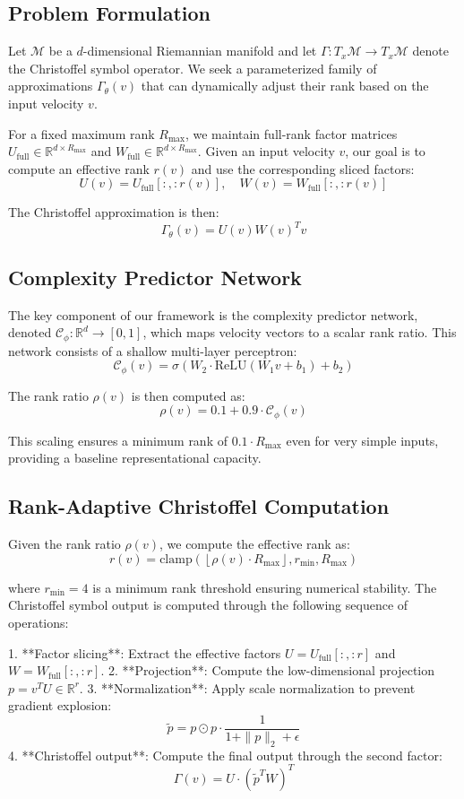 \subsection{Problem Formulation}
Let $\mathcal{M}$ be a $d$-dimensional Riemannian manifold and let $\Gamma: T_x\mathcal{M} \to T_x\mathcal{M}$ denote the Christoffel symbol operator. We seek a parameterized family of approximations $\Gamma_\theta(v)$ that can dynamically adjust their rank based on the input velocity $v$.

For a fixed maximum rank $R_{\max}$, we maintain full-rank factor matrices $U_{\text{full}} \in \mathbb{R}^{d \times R_{\max}}$ and $W_{\text{full}} \in \mathbb{R}^{d \times R_{\max}}$. Given an input velocity $v$, our goal is to compute an effective rank $r(v)$ and use the corresponding sliced factors:
$$U(v) = U_{\text{full}}[:, :r(v)], \quad W(v) = W_{\text{full}}[:, :r(v)]$$

The Christoffel approximation is then:
$$\Gamma_\theta(v) = U(v) W(v)^T v$$

\subsection{Complexity Predictor Network}
The key component of our framework is the complexity predictor network, denoted $\mathcal{C}_\phi: \mathbb{R}^d \to [0,1]$, which maps velocity vectors to a scalar rank ratio. This network consists of a shallow multi-layer perceptron:
$$\mathcal{C}_\phi(v) = \sigma(W_2 \cdot \text{ReLU}(W_1 v + b_1) + b_2)$$

The rank ratio $\rho(v)$ is then computed as:
$$\rho(v) = 0.1 + 0.9 \cdot \mathcal{C}_\phi(v)$$

This scaling ensures a minimum rank of $0.1 \cdot R_{\max}$ even for very simple inputs, providing a baseline representational capacity.

\subsection{Rank-Adaptive Christoffel Computation}
Given the rank ratio $\rho(v)$, we compute the effective rank as:
$$r(v) = \text{clamp}\left( \left\lfloor \rho(v) \cdot R_{\max} \right\rfloor, r_{\min}, R_{\max} \right)$$

where $r_{\min} = 4$ is a minimum rank threshold ensuring numerical stability. The Christoffel symbol output is computed through the following sequence of operations:

1. **Factor slicing**: Extract the effective factors $U = U_{\text{full}}[:, :r]$ and $W = W_{\text{full}}[:, :r]$.
2. **Projection**: Compute the low-dimensional projection $p = v^T U \in \mathbb{R}^r$.
3. **Normalization**: Apply scale normalization to prevent gradient explosion:
$$\tilde{p} = p \odot p \cdot \frac{1}{1 + \|p\|_2 + \epsilon}$$
4. **Christoffel output**: Compute the final output through the second factor:
$$\Gamma(v) = U \cdot \left( \tilde{p}^T W \right)^T$$

